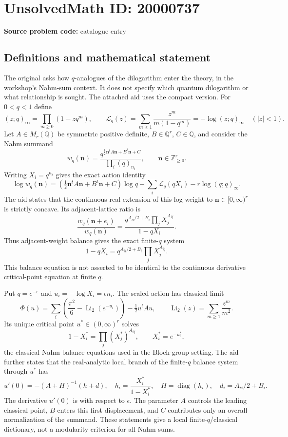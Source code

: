 \documentclass[11pt]{article}
\newcommand{\Z}{\mathbb{Z}}
\newcommand{\Q}{\mathbb{Q}}
\begin{document}
\section*{UnsolvedMath ID: 20000737}
\textbf{Source problem code:} catalogue entry
\subsection{Definitions and mathematical statement}
The original asks how $q$-analogues of the dilogarithm enter the theory, in the workshop's Nahm-sum context. It does not specify which quantum dilogarithm or what relationship is sought. The attached aid uses the compact version. For $0<q<1$ define
\[
(z;q)_\infty=\prod_{m\ge0}(1-zq^m),\qquad
\mathcal L_q(z)=\sum_{m\ge1}\frac{z^m}{m(1-q^m)}=-\log(z;q)_\infty\quad(|z|<1).
\]
Let $A\in M_r(\Q)$ be symmetric positive definite, $B\in\Q^r$, $C\in\Q$, and consider the Nahm summand
\[
w_q(\mathbf n)=\frac{q^{\frac12\mathbf n^tA\mathbf n+B^t\mathbf n+C}}{\prod_i(q)_{n_i}},\qquad \mathbf n\in\Z_{\ge0}^r.
\]
Writing $X_i=q^{n_i}$ gives the exact action identity
\[
\log w_q(\mathbf n)=\left(\tfrac12\mathbf n^tA\mathbf n+B^t\mathbf n+C\right)\log q
-\sum_i\mathcal L_q(qX_i)-r\log(q;q)_\infty.
\]
The aid states that the continuous real extension of this log-weight to $\mathbf n\in[0,\infty)^r$ is strictly concave. Its adjacent-lattice ratio is
\[
\frac{w_q(\mathbf n+e_i)}{w_q(\mathbf n)}
=\frac{q^{A_{ii}/2+B_i}\prod_jX_j^{A_{ij}}}{1-qX_i}.
\]
Thus adjacent-weight balance gives the exact finite-$q$ system
\[
1-qX_i=q^{A_{ii}/2+B_i}\prod_jX_j^{A_{ij}}.
\]
This balance equation is not asserted to be identical to the continuous derivative critical-point equation at finite $q$.

Put $q=e^{-\epsilon}$ and $u_i=-\log X_i=\epsilon n_i$. The scaled action has classical limit
\[
\Phi(u)=\sum_i\left(\frac{\pi^2}{6}-\operatorname{Li}_2(e^{-u_i})\right)-\tfrac12u^tAu,
\qquad \operatorname{Li}_2(z)=\sum_{m\ge1}\frac{z^m}{m^2}.
\]
Its unique critical point $u^*\in(0,\infty)^r$ solves
\[
1-X_i^*=\prod_j(X_j^*)^{A_{ij}},\qquad X_i^*=e^{-u_i^*},
\]
the classical Nahm balance equations used in the Bloch-group setting. The aid further states that the real-analytic local branch of the finite-$q$ balance system through $u^*$ has
\[
u'(0)=-(A+H)^{-1}(h+d),\quad
h_i=\frac{X_i^*}{1-X_i^*},\quad H=\operatorname{diag}(h_i),\quad d_i=A_{ii}/2+B_i.
\]
The derivative $u'(0)$ is with respect to $\epsilon$. The parameter $A$ controls the leading classical point, $B$ enters this first displacement, and $C$ contributes only an overall normalization of the summand. These statements give a local finite-$q$/classical dictionary, not a modularity criterion for all Nahm sums.
\end{document}

